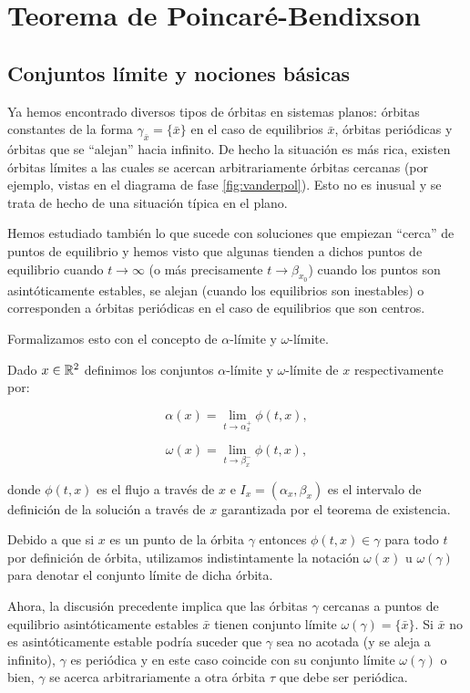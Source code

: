 \chapter{Teorema de Poincaré-Bendixson} \label{cap:poincarebendixson}

\section{Conjuntos límite y nociones básicas}

Ya hemos encontrado diversos tipos de órbitas en sistemas planos: órbitas constantes de la forma $\gamma_{\bar{x}} = \{\bar{x}\}$ en el caso de equilibrios $\bar{x}$, órbitas periódicas y órbitas que se ``alejan'' hacia infinito.
De hecho la situación es más rica, existen órbitas límites a las cuales se acercan arbitrariamente órbitas cercanas (por ejemplo, vistas en el diagrama de fase \ref{fig:vanderpol}). Esto no es inusual y se trata de hecho de una situación típica en el plano.

Hemos estudiado también lo que sucede con soluciones que empiezan ``cerca'' de puntos de equilibrio y hemos visto que algunas tienden a dichos puntos de equilibrio cuando $t \to \infty$ (o más precisamente $t \to \beta_{x_0}$) cuando los puntos son asintóticamente estables, se alejan (cuando los equilibrios son inestables) o corresponden a órbitas periódicas en el caso de equilibrios que son centros.

Formalizamos esto con el concepto de $\alpha$-límite y $\omega$-límite.

\begin{definition}Dado $x \in {\ensuremath{\mathbb{R}}}^2$ definimos los conjuntos $\alpha$-límite y $\omega$-límite de $x$ respectivamente por:

$$
	\alpha(x) = \lim_{t \to \alpha_{x}^+}{\phi(t,x)},
$$

$$
	\omega(x) = \lim_{t \to \beta_{x}^-}{\phi(t,x)},
$$

donde $\phi(t,x)$ es el flujo a través de $x$ e $I_x = (\alpha_x, \beta_x)$ es el intervalo de definición de la solución a través de $x$ garantizada por el teorema de existencia.
\end{definition}

Debido a que si $x$ es un punto de la órbita $\gamma$ entonces $\phi(t,x) \in \gamma$ para todo $t$ por definición de órbita, utilizamos indistintamente la notación $\omega(x)$ u $\omega(\gamma)$ para denotar el conjunto límite de dicha órbita.

Ahora, la discusión precedente implica que las órbitas $\gamma$ cercanas a puntos de equilibrio asintóticamente estables $\bar{x}$ tienen conjunto límite $\omega(\gamma) = \{\bar{x}\}$. Si $\bar{x}$ no es asintóticamente estable podría suceder que $\gamma$ sea no acotada (y se aleja a infinito), $\gamma$ es periódica y en este caso coincide con su conjunto límite $\omega(\gamma)$ o bien, $\gamma$ se acerca arbitrariamente a otra órbita $\tau$ que debe ser periódica.


